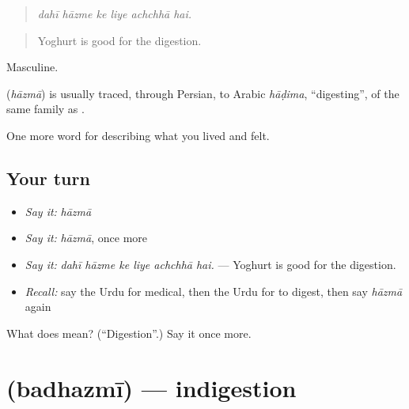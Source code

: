 \begin{quote}
     
\end{quote}

\begin{quote}
\emph{dahī hāzme ke liye achchhā hai.}
\end{quote}

\begin{quote}
Yoghurt is good for the digestion.
\end{quote}

Masculine.

\begin{cousinweb}
\textbf{} (\emph{hāzmā}) is usually traced, through Persian, to Arabic \emph{hāḍima}, \textquotedblleft{}digesting\textquotedblright{}, of the same family as \textbf{}.
\end{cousinweb}

\begin{grammarlens}[title={What you've built}]
One more word for describing what you lived and felt.
\end{grammarlens}

\subsection*{Your turn}
\begin{itemize}
\raggedright
  \item \emph{Say it:} \emph{hāzmā}
  \item \emph{Say it:} \emph{hāzmā}, once more
  \item \emph{Say it:} \emph{dahī hāzme ke liye achchhā hai.} — Yoghurt is good for the digestion.
  \item \emph{Recall:} say the Urdu for medical, then the Urdu for to digest, then say \emph{hāzmā} again
\end{itemize}

\begin{tcolorbox}[breakable,colback=teal!4,colframe=teal!35!black,title={Before you move on}]
What does  mean? (\textquotedblleft{}Digestion\textquotedblright{}.) Say it once more.
\end{tcolorbox}
\section[\texorpdfstring{\ur{بدہضمی} (badhazmī)}{بدہضمی (badhazmī)}]{ (badhazmī) — indigestion}

\label{lesson:UR-C472-badhazmi}



